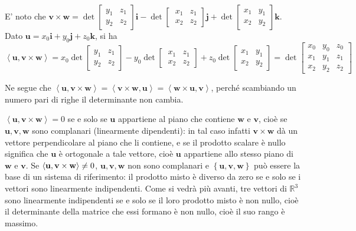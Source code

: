 \documentclass{article}
\begin{document}
E' noto che $\mathbf{v\times w}=\det \left[ 
\begin{array}{cc}
y_{1} & z_{1} \\ 
y_{2} & z_{2}%
\end{array}%
\right] \mathbf{i-}\det \left[ \ 
\begin{array}{cc}
x_{1} & z_{1} \\ 
x_{2} & z_{2}%
\end{array}%
\right] \mathbf{j+}\det \left[ 
\begin{array}{cc}
x_{1} & y_{1} \\ 
x_{2} & y_{2}%
\end{array}%
\right] \mathbf{k}$. Dato $\mathbf{u}=x_{0}\mathbf{i}+y_{0}\mathbf{j}+z_{0}%
\mathbf{k}$, si ha%
\begin{equation*}
\left\langle \mathbf{u,v\times w}\right\rangle =x_{0}\det \left[ 
\begin{array}{cc}
y_{1} & z_{1} \\ 
y_{2} & z_{2}%
\end{array}%
\right] -y_{0}\det \left[ \ 
\begin{array}{cc}
x_{1} & z_{1} \\ 
x_{2} & z_{2}%
\end{array}%
\right] +z_{0}\det \left[ 
\begin{array}{cc}
x_{1} & y_{1} \\ 
x_{2} & y_{2}%
\end{array}%
\right] =\det \left[ 
\begin{array}{ccc}
x_{0} & y_{0} & z_{0} \\ 
x_{1} & y_{1} & z_{1} \\ 
x_{2} & y_{2} & z_{2}%
\end{array}%
\right]
\end{equation*}

Ne segue che $\left\langle \mathbf{u,v\times w}\right\rangle =\left\langle 
\mathbf{v\times w,u}\right\rangle =\left\langle \mathbf{w}\times \mathbf{u,v}%
\right\rangle $, perch\'{e} scambiando un numero pari di righe il
determinante non cambia.

$\left\langle \mathbf{u,v\times w}\right\rangle =0$ se e solo se $\mathbf{u}$
appartiene al piano che contiene $\mathbf{w}$ e $\mathbf{v}$, cio\`{e} se $%
\mathbf{u,v,w}$ sono complanari (linearmente dipendenti): in tal caso
infatti $\mathbf{v\times w}$ d\`{a} un vettore perpendicolare al piano che
li contiene, e se il prodotto scalare \`{e} nullo significa che $\mathbf{u}$ 
\`{e} ortogonale a tale vettore, cio\`{e} $\mathbf{u}$ appartiene allo
stesso piano di $\mathbf{w}$ e $\mathbf{v}$. Se $\left\langle \mathbf{%
u,v\times w}\right\rangle \neq 0$, $\mathbf{u,v,w}$ non sono complanari e $%
\left\{ \mathbf{u,v,w}\right\} $ pu\`{o} essere la base di un sistema di
riferimento: il prodotto misto \`{e} diverso da zero se e solo se i vettori
sono linearmente indipendenti. Come si vedr\`{a} pi\`{u} avanti, tre vettori
di $%
\mathbb{R}
^{3}$ sono linearmente indipendenti se e solo se il loro prodotto misto \`{e}
non nullo, cio\`{e} il determinante della matrice che essi formano \`{e} non
nullo, cio\`{e} il suo rango \`{e} massimo.
\end{document}
